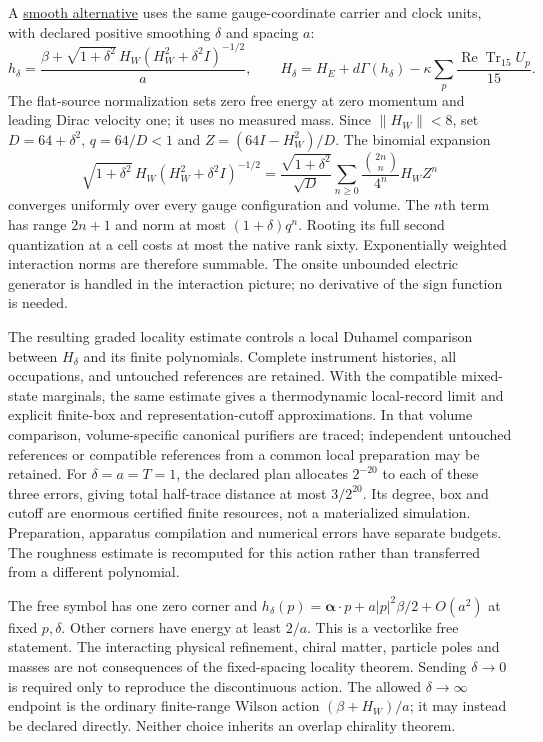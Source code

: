 A \href{https://github.com/FloatingPragma/observer-patch-holography/blob/main/model/particle_smooth_sign_field/PROOF.md}{smooth alternative}
uses the same gauge-coordinate carrier and clock units, with declared
positive smoothing $\delta$ and spacing $a$:
\[
 h_\delta=\frac{\beta+\sqrt{1+\delta^2}\,
             H_W(H_W^2+\delta^2I)^{-1/2}}{a},\qquad
 H_\delta=H_E+d\Gamma(h_\delta)
              -\kappa\sum_p\frac{\operatorname{Re}\operatorname{Tr}_{15}U_p}{15}.
\]
The flat-source normalization sets zero free energy at zero momentum
and leading Dirac velocity one; it uses no measured mass. Since
$\|H_W\|<8$, set $D=64+\delta^2$, $q=64/D<1$ and
$Z=(64I-H_W^2)/D$. The binomial expansion
\[
 \sqrt{1+\delta^2}\,H_W(H_W^2+\delta^2I)^{-1/2}
 =\frac{\sqrt{1+\delta^2}}{\sqrt D}
   \sum_{n\ge0}\frac{\binom{2n}{n}}{4^n}H_W Z^n
\]
converges uniformly over every gauge configuration and volume. The
$n$th term has range $2n+1$ and norm at most $(1+\delta)q^n$.
Rooting its full second quantization at a cell costs at most the native
rank sixty. Exponentially weighted interaction norms are therefore
summable. The onsite unbounded electric generator is handled in the
interaction picture; no derivative of the sign function is needed.

The resulting graded locality estimate controls a local Duhamel
comparison between $H_\delta$ and its finite polynomials. Complete
instrument histories, all occupations, and untouched references are
retained. With the compatible mixed-state marginals, the same estimate
gives a thermodynamic local-record limit and explicit finite-box and
representation-cutoff approximations. In that volume comparison,
volume-specific canonical purifiers are traced; independent untouched
references or compatible references from a common local preparation
may be retained. For $\delta=a=T=1$, the declared
plan allocates $2^{-20}$ to each of these three errors, giving total
half-trace distance at most $3/2^{20}$. Its degree, box and cutoff are
enormous certified finite resources, not a materialized simulation.
Preparation, apparatus compilation and numerical errors have separate
budgets. The roughness estimate is recomputed for this action rather
than transferred from a different polynomial.

The free symbol has one zero corner and
$h_\delta(p)=\boldsymbol\alpha\cdot p+
 a|p|^2\beta/2+O(a^2)$ at fixed $p,\delta$. Other corners have energy
at least $2/a$. This is a vectorlike free statement. The interacting
physical refinement, chiral matter, particle poles and masses are not
consequences of the fixed-spacing locality theorem. Sending
$\delta\to0$ is required only to reproduce the discontinuous action.
The allowed $\delta\to\infty$ endpoint is the ordinary finite-range
Wilson action $(\beta+H_W)/a$; it may instead be declared directly.
Neither choice inherits an overlap chirality theorem.

